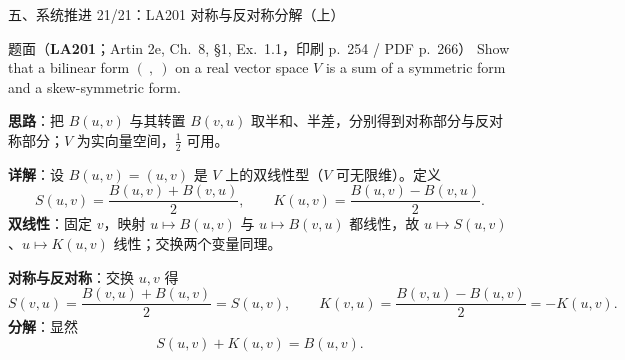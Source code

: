 \documentclass[aspectratio=169,10pt,fontset=none]{ctexbeamer}
\newcommand{\ex}[1]{\textcolor{accent}{\footnotesize\bfseries #1}}
\newcommand{\key}[1]{\textcolor{ink}{\bfseries #1}}
\begin{document}
\begin{frame}[t]{五、系统推进 21/21：LA201 对称与反对称分解（上）}
\label{ex:LA201}
\scriptsize
\begin{block}{\footnotesize 题面（\ex{LA201}；Artin 2e, Ch.~8, §1, Ex.~1.1，印刷 p.~254 / PDF p.~266）}
Show that a bilinear form $(\ ,\ )$ on a real vector space $V$ is a sum of a symmetric form and a skew-symmetric form.
\end{block}
\key{思路}：把 $B(u,v)$ 与其转置 $B(v,u)$ 取半和、半差，分别得到对称部分与反对称部分；$V$ 为实向量空间，$\tfrac12$ 可用。

\key{详解}：设 $B(u,v)=(u,v)$ 是 $V$ 上的双线性型（$V$ 可无限维）。定义
\[ S(u,v)=\frac{B(u,v)+B(v,u)}{2},\qquad K(u,v)=\frac{B(u,v)-B(v,u)}{2}. \]
\textbf{双线性}：固定 $v$，映射 $u\mapsto B(u,v)$ 与 $u\mapsto B(v,u)$ 都线性，故 $u\mapsto S(u,v)$、$u\mapsto K(u,v)$ 线性；交换两个变量同理。

\textbf{对称与反对称}：交换 $u,v$ 得
\[ S(v,u)=\frac{B(v,u)+B(u,v)}{2}=S(u,v),\qquad K(v,u)=\frac{B(v,u)-B(u,v)}{2}=-K(u,v). \]
\textbf{分解}：显然
\[ S(u,v)+K(u,v)=B(u,v). \]
\end{frame}
\end{document}
